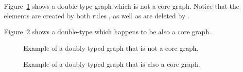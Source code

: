 \begin{example} Figure~\ref{fig:process:core-graph:counter-example} shows a double-type graph which is not a core graph. Notice that the elements  are created by both rules , as well as  are deleted by . 

  Figure~\ref{fig:process:core-graph:example} shows a double-type which happens to be also a core graph.
\begin{figure}[!ht]
  \centering
  \caption{Example of a doubly-typed graph that is not a core graph.}\label{fig:process:core-graph:counter-example}
\end{figure}

\begin{figure}[!ht]
  \centering
  \caption{Example of a doubly-typed graph that is also a core graph.}\label{fig:process:core-graph:example}
\end{figure}
\end{example}

